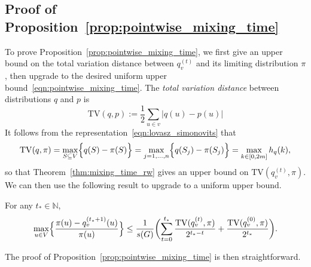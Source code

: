 \subsection{Proof of Proposition~\ref{prop:pointwise_mixing_time}}
\label{subsec:pf_prop_pointwise_mixing_time}
To prove Proposition~\ref{prop:pointwise_mixing_time}, we first give an upper bound on the total variation distance between $q_v^{(t)}$ and its limiting distribution $\pi$, then upgrade to the desired uniform upper bound~\eqref{eqn:pointwise_mixing_time}. The \emph{total variation distance} between distributions $q$ and $p$ is
\begin{equation*}
\mathrm{TV}(q,p) := \frac{1}{2}\sum_{u \in v} \bigl|q(u) - p(u)\bigr|
\end{equation*}
It follows from the representation~\eqref{eqn:lovasz_simonovits} that
\begin{equation*}
\mathrm{TV}(q,\pi) = \max_{S \subseteq V} \Bigl\{q(S) - \pi(S)\Bigr\} = \max_{j = 1,\ldots,n} \Bigl\{q(S_j) - \pi(S_j)\Bigr\} = \max_{k \in [0,2m]} h_q(k),
\end{equation*}
so that Theorem~\ref{thm:mixing_time_rw} gives an upper bound on $\mathrm{TV}(q_v^{(t)},\pi)$. We can then use the following result to upgrade to a uniform upper bound.

\begin{lemma}
	\label{lem:tv_to_pointwise}
	For any $t_{\ast} \in \mathbb{N}$,
	\begin{equation*}
	\max_{u \in V} \Bigl\{\frac{\pi(u) - q_v^{(t_{\ast} + 1)}(u)}{\pi(u)}\Bigr\} \leq \frac{1}{s(G)} \biggl(\sum_{t = 0}^{t_{\ast}} \frac{\mathrm{TV}(q_v^{(t)}, \pi)}{2^{t_{\ast} - t}} + \frac{\mathrm{TV}(q_v^{(0)}, \pi)}{2^{t_{\ast}}}\biggr).
	\end{equation*}
\end{lemma}
The proof of Proposition~\ref{prop:pointwise_mixing_time} is then straightforward.
